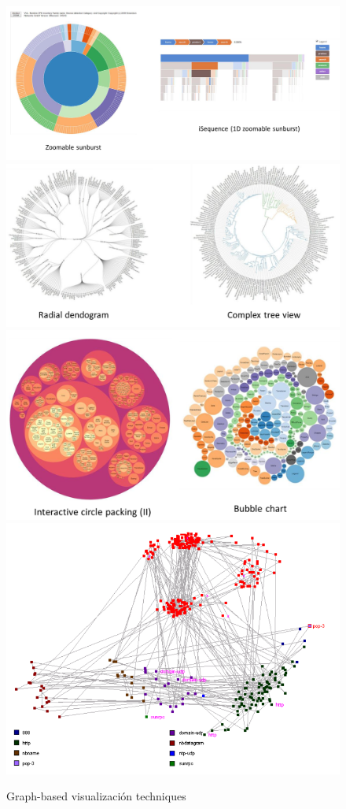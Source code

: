 \begin{figure}[htbp]
   \centering
   \includegraphics{images/03/sunburst.png}
   \includegraphics{images/03/dendogram.png}
   \includegraphics{images/03/circlepacking.png}
   \includegraphics{images/03/interactivenodelinks.png}
   \caption{Graph-based visualización techniques}
   \label{fig:03/graphbased}
\end{figure}

